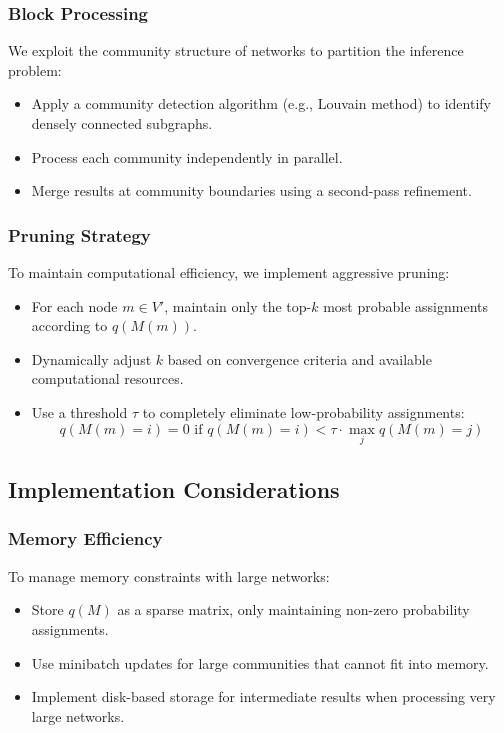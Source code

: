 \documentclass[12pt]{article}
\begin{document}
\subsubsection{Block Processing}
We exploit the community structure of networks to partition the inference problem:

\begin{itemize}
\item Apply a community detection algorithm (e.g., Louvain method) to identify densely connected subgraphs.
\item Process each community independently in parallel.
\item Merge results at community boundaries using a second-pass refinement.
\end{itemize}

\subsubsection{Pruning Strategy}
To maintain computational efficiency, we implement aggressive pruning:

\begin{itemize}
\item For each node $m \in V'$, maintain only the top-$k$ most probable assignments according to $q(M(m))$.
\item Dynamically adjust $k$ based on convergence criteria and available computational resources.
\item Use a threshold $\tau$ to completely eliminate low-probability assignments:
$$q(M(m) = i) = 0 \text{ if } q(M(m) = i) < \tau \cdot \max_j q(M(m) = j)$$
\end{itemize}

\subsection{Implementation Considerations}

\subsubsection{Memory Efficiency}
To manage memory constraints with large networks:

\begin{itemize}
\item Store $q(M)$ as a sparse matrix, only maintaining non-zero probability assignments.
\item Use minibatch updates for large communities that cannot fit into memory.
\item Implement disk-based storage for intermediate results when processing very large networks.
\end{itemize}
\end{document}

